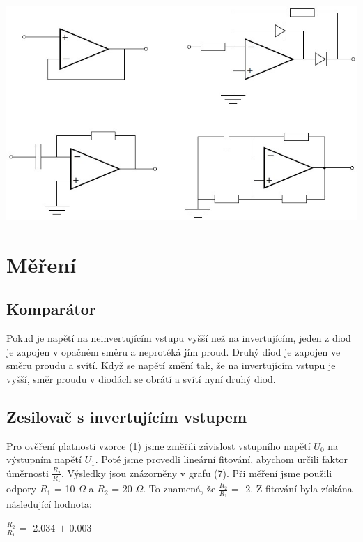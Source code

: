 \documentclass[a4paper,11pt]{article}
\begin{document}
    \begin{minipage}[t]{0.5\textwidth}
                \vspace{10pt}   
                \par \centering
                \includegraphics[scale=0.45]{deriv.jpg}
                \captionsetup{justification=centering, font=footnotesize}
                \label{fig:deriv.jpg}
                \vspace{10pt}
                \raggedright

        \section{Měření}
            \subsection{Komparátor}
                Pokud je napětí na neinvertujícím vstupu vyšší než na invertujícím, jeden z diod je zapojen v opačném směru a neprotéká jím proud. Druhý diod je zapojen ve směru proudu a svítí. Když se napětí změní tak, že na invertujícím vstupu je vyšší, směr proudu v diodách se obrátí a svítí nyní druhý diod.

            \subsection{Zesilovač s invertujícím vstupem}
                Pro ověření platnosti vzorce (1) jsme změřili závislost vstupního napětí $U_0$ na výstupním napětí $U_1$. Poté jsme provedli lineární fitování, abychom určili faktor úměrnosti $\frac{R_2}{R_1}$. Výsledky jsou znázorněny v grafu (7).
                Při měření jsme použili odpory $R_1$ = 10 $\Omega$ a $R_2$ = 20 $\Omega$.  To znamená, že $\frac{R_2}{R_1}$ = -2. Z fitování byla získána následující hodnota: 
                \begin{center}
                    $\frac{R_2}{R_1}$ = -2.034 $\pm$ 0.003
                \end{center}


\end{minipage}
\end{document}
